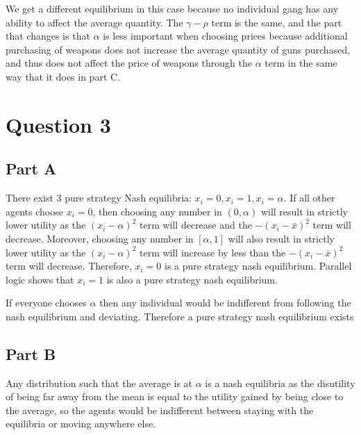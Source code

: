 \documentclass[11pt]{article} %
\begin{document}
We get a different equilibrium in this case because no individual gang has any ability to affect the average quantity. The $\gamma - \rho$ term is the same, and the part that changes is that $\alpha$ is less important when choosing prices because additional purchasing of weapons does not increase the average quantity of guns purchased, and thus does not affect the price of weapons through the $\alpha$ term in the same way that it does in part C.

\section{Question 3} 
\subsection{Part A}
%
There exist 3 pure strategy Nash equilibria: $x_i=0,x_i=1,x_i = \alpha.$ If all other agents choose $x_i=0$, then choosing any number in $(0,\alpha)$ will result in strictly lower utility as the $(x_i - \alpha)^2$ term will decrease and the $-(x_i - \bar{x})^2$ term will decrease. Moreover, choosing any number in $[\alpha,1]$ will also result in strictly lower utility as the $(x_i - \alpha)^2$ term will increase by less than the $-(x_i - \bar{x})^2$ term will decrease. Therefore, $x_i = 0$ is a pure strategy nash equilibrium. Parallel logic shows that $x_i=1$ is also a pure strategy nash equilibrium.

If everyone chooses $\alpha$ then any individual would be indifferent from following the nash equilibrium and deviating. Therefore a pure strategy nash equilibrium exists

\subsection{Part B}
Any distribution such that the average is at $\alpha$ is a nash equilibria as the disutility of being far away from the mean is equal to the utility gained by being close to the average, so the agents would be indifferent between staying with the equilibria or moving anywhere else.
\end{document}

